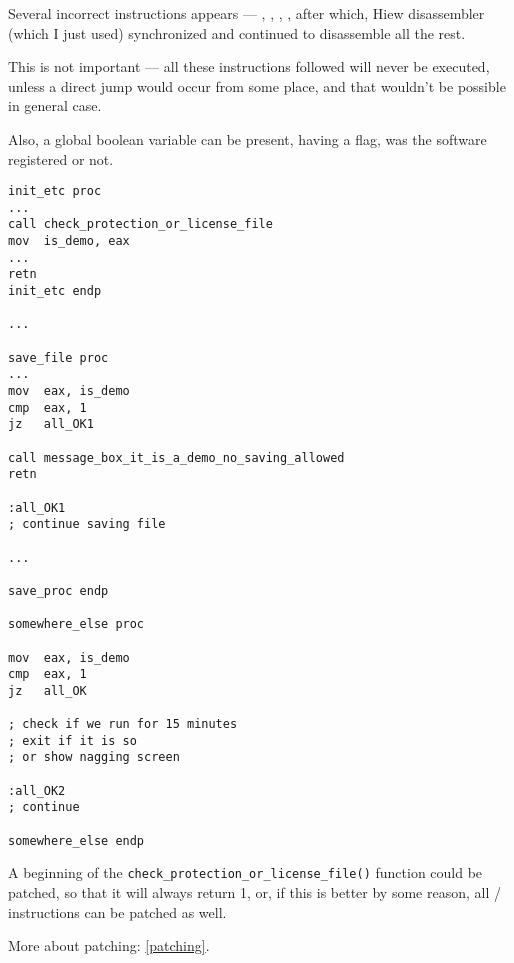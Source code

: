 Several incorrect instructions appears --- , , , ,
after which, Hiew disassembler (which I just used) synchronized and continued to disassemble all the rest.

This is not important --- all these instructions followed  will never be executed,
unless a direct jump would occur from some place, and that wouldn't be possible in general case.

\myhrule{}

Also, a global boolean variable can be present, having a flag, was the software registered or not.

\begin{lstlisting}[style=customasmx86]
init_etc proc
...
call check_protection_or_license_file
mov  is_demo, eax
...
retn
init_etc endp

...

save_file proc
...
mov  eax, is_demo
cmp  eax, 1
jz   all_OK1

call message_box_it_is_a_demo_no_saving_allowed
retn

:all_OK1
; continue saving file

...

save_proc endp

somewhere_else proc

mov  eax, is_demo
cmp  eax, 1
jz   all_OK

; check if we run for 15 minutes
; exit if it is so
; or show nagging screen

:all_OK2
; continue

somewhere_else endp
\end{lstlisting}

A beginning of the \verb|check_protection_or_license_file()| function could be patched, so that it will always return 1,
or, if this is better by some reason, all / instructions can be patched as well.

More about patching: \ref{patching}.

